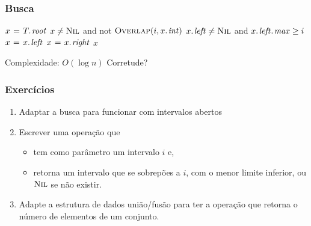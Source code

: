 \documentclass{beamer}
\begin{document}
\begin{frame}
\frametitle{Busca}

\begin{codebox}
\li $x \gets \attrib{T}{root}$
\li \While $x \neq \textnormal{\scshape Nil}$ and not $\proc{Overlap}(i, \attrib{x}{int})$ 
\li \Do \If $\attrib{x}{left} \neq \const{Nil}$ and $\attrib{\attrib{x}{left}}{max} \ge i$
\li      \Then $x \gets \attrib{x}{left}$
\li      \Else $x \gets \attrib{x}{right}$
         \End
    \End
\li \Return $x$
\end{codebox}

\alert{Complexidade}: $O(\log n)$
\pause
\alert{Corretude?}
\end{frame}

\begin{frame}
\frametitle{Exercícios}

\begin{enumerate}
\item Adaptar a busca para funcionar com intervalos abertos
\item Escrever uma operação que
\begin{itemize}
\item tem como parâmetro um intervalo $i$ e,
\item retorna um intervalo que se sobrepões a $i$, com o menor limite
  inferior, ou $\textnormal{\scshape Nil}$ se não existir.
\end{itemize}
\item Adapte a estrutura de dados união/fusão para ter a operação que
  retorna o número de elementos de um conjunto.
\end{enumerate}
\end{frame}
\end{document}
